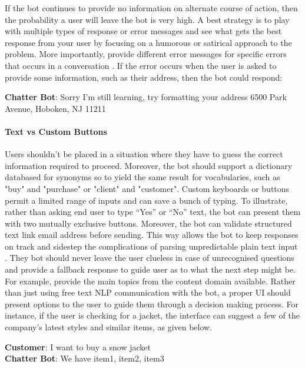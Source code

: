 If the bot continues to provide no information on alternate course of action, then the probability a user will leave the bot is very high. A best strategy is to play with multiple types of response or error messages and see what gets the best response from your user by focusing on a humorous or satirical approach to the problem. More importantly, provide different error messages for specific errors that occurs in a conversation \cite{fadhil2018}. If the error occurs when the user is asked to provide some information, such as their address, then the bot could respond:\\

{ \selectfont

  \color{red}
  \textbf{Chatter Bot}:  Sorry I’m still learning, try formatting your address 6500 Park Avenue, Hoboken, NJ 11211\\
  
  \color{black}
}

\paragraph{Text vs Custom Buttons}
Users shouldn’t be placed in a situation where they have to guess the correct information required to proceed. Moreover, the bot should support a dictionary databased for synonyms so to yield the same result for vocabularies, such as "buy" and "purchase" or "client" and "customer". Custom keyboards or buttons permit a limited range of inputs and can save a bunch of typing. To illustrate, rather than asking end user to type “Yes” or “No” text, the bot can present them with two mutually exclusive buttons. Moreover, the bot can validate structured text link email address before sending. This way allows the bot to keep responses on track and sidestep the complications of parsing unpredictable plain text input \cite{khan2018}. They bot should never leave the user clueless in case of unrecognised questions and provide a fallback response to guide user as to what the next step might be. For example, provide the main topics from the content domain available. Rather than just using free text NLP communication with the bot, a proper UI should present options to the user to guide them through a decision making process. For instance, if the user is checking for a jacket, the interface can suggest a few of the company’s latest styles and similar items, as given below.\\

{ \selectfont

  \color{blue}
  \textbf{Customer}:  I want to buy a snow jacket \\
  
  \color{red}
  \textbf{Chatter Bot}:   We have item1, item2, item3\\
  
  \color{black}
}

